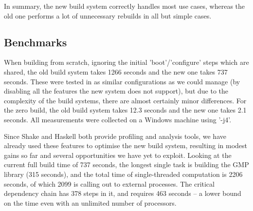 In summary, the new build system correctly handles most use cases, whereas
the old one performs a lot of unnecessary rebuilds in all but simple cases.

\subsection{Benchmarks\label{sec:benchmarks}}

When building from scratch, ignoring the initial \lst'boot'/\lst'configure'
steps which are shared, the old build system takes 1266 seconds and the new
one takes 737 seconds. These were tested in as similar configurations as we could
manage (by disabling all the features the new system does not support),
but due to the complexity of the build systems, there are almost certainly
minor differences. For the zero build, the old build system takes 12.3
seconds and the new one takes 2.1 seconds. All measurements were collected on a
Windows machine using \lst'-j4'. 

Since Shake and Haskell both provide profiling and analysis tools, we have
already used these features to optimise the new build system, resulting in
modest gains so far and several opportunities we have yet to exploit. Looking at
the current full build time of 737 seconds, the longest single task is
building the GMP library (315 seconds), and the total time of single-threaded
computation is 2206 seconds, of which 2099 is calling out to external processes.
The critical dependency chain has 378 steps in it, and requires 463 seconds -- a
lower bound on the time even with an unlimited number of processors.
